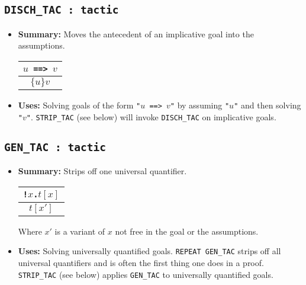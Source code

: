 \subsection{\tt DISCH\_TAC : tactic}\label{DISCHTAC}

\begin{itemize}

\item{\bf Summary:} Moves the antecedent
of an implicative goal into the assumptions.

\begin{center}
\begin{tabular}{c} \\
$u${\small\verb| ==> |}$v$
\\ \hline \hline
$\{u\}v$
\\
\end{tabular}
\end{center}


\item{\bf Uses:} Solving goals of the form
{\small\verb|"|}$u${\small\verb| ==> |}$v${\small\verb|"|} by assuming {\small\verb|"|}$u${\small\verb|"|} and then solving
{\small\verb|"|}$v${\small\verb|"|}.
{\small\verb|STRIP_TAC|} (see below) will invoke {\small\verb|DISCH_TAC|} on implicative goals.
\end{itemize}

\subsection{\tt GEN\_TAC : tactic}

\begin{itemize}

\item{\bf  Summary:} Strips off one universal quantifier.


\begin{center}
\begin{tabular}{c} \\
{\small\verb|!|}$x${\small\verb|.|}$t[x]$
\\ \hline \hline
$t[x']$
\\
\end{tabular}
\end{center}

\noindent Where $x'$ is a variant of $x$
not free in the goal or the assumptions.

\item{\bf   Uses:} Solving universally quantified goals.
{\small\verb|REPEAT GEN_TAC|} strips off all
universal quantifiers and is often the first thing one does in a proof.
{\small\verb|STRIP_TAC|} (see below) applies {\small\verb|GEN_TAC|} to universally quantified goals.
\end{itemize}


